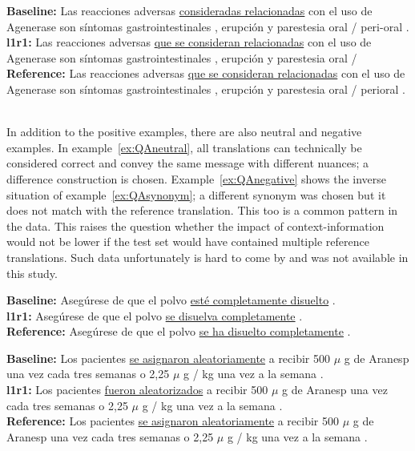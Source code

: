 \documentclass[smallextended]{svjour3}       %
\theoremstyle{break}
\begin{document}
\begin{exe}
\footnotesize
\ex \textbf{Baseline:} Las reacciones adversas \underline{consideradas relacionadas} con el uso de Agenerase son síntomas gastrointestinales , erupción y parestesia oral / peri-oral . \\
\textbf{l1r1:}  Las reacciones adversas \underline{que se consideran relacionadas} con el uso de Agenerase son síntomas gastrointestinales , erupción y parestesia oral / \\
\textbf{Reference:} Las reacciones adversas \underline{que se consideran relacionadas} con el uso de Agenerase son síntomas gastrointestinales , erupción y parestesia oral / perioral . \\ \\
\label{ex:QAgrammar}
\end{exe}

In addition to the positive examples, there are also neutral and negative
examples. In example~\ref{ex:QAneutral}, all translations can technically be
considered correct and convey the same message with different nuances; a
difference construction is chosen. Example~\ref{ex:QAnegative} shows the
inverse situation of example~\ref{ex:QAsynonym}; a different synonym was chosen
but it does not match with the reference translation. This too is a common
pattern in the data. This raises the question whether the impact of
context-information would not be lower if the test set would have contained
multiple reference translations. Such data unfortunately is hard to come by and
was not available in this study.

\begin{exe}
\footnotesize
\ex \textbf{Baseline:} Asegúrese de que el polvo \underline{esté completamente disuelto} . \\
\textbf{l1r1:} Asegúrese de que el polvo \underline{se disuelva completamente} .  \\
\textbf{Reference:} Asegúrese de que el polvo \underline{se ha disuelto completamente} .
\label{ex:QAneutral}
\end{exe}

\begin{exe}
\footnotesize
\ex \textbf{Baseline:} Los pacientes \underline{se asignaron aleatoriamente} a recibir 500 $\mu$ g de Aranesp una vez cada tres semanas o 2,25 $\mu$ g / kg una vez a la semana . \\
\textbf{l1r1:} Los pacientes \underline{fueron aleatorizados} a recibir 500 $\mu$ g de Aranesp una vez cada tres semanas o 2,25 $\mu$ g / kg una vez a la semana . \\
\textbf{Reference:} Los pacientes \underline{se asignaron aleatoriamente} a recibir 500 $\mu$ g de Aranesp una vez cada tres semanas o 2,25 $\mu$ g / kg una vez a la semana .
\label{ex:QAnegative}
\end{exe}
\end{document}
